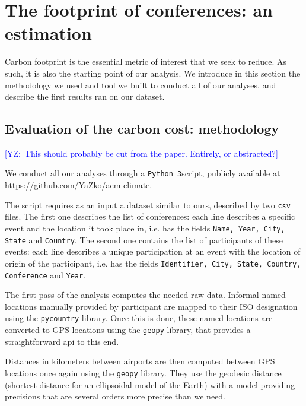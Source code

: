 \documentclass[manuscript, review, screen]{acmart}
\newcommand{\yz}[1]{\textcolor{blue}{{[YZ:~#1]}}}
\newcommand{\yz}[1]{}
\newcommand{\python}{\texttt{Python 3}}
\begin{document}

\section{The footprint of conferences: an estimation}

Carbon footprint is the essential metric of interest that we seek to reduce.
As such, it is also the starting point of our analysis.
We introduce in this section the methodology we used and tool we built to
conduct all of our analyses, and describe the first results ran on our dataset.

\subsection{Evaluation of the carbon cost: methodology}
\label{sec:methodo}

\yz{This should probably be cut from the paper. Entirely, or abstracted?}

We conduct all our analyses through a \python script, publicly available at
\url{https://github.com/YaZko/acm-climate}.

The script requires as an input a dataset similar to ours, described by two
\texttt{csv} files. The first one describes the list of conferences: each line
describes a specific event and the location it took place in, i.e. has the
fields \texttt{Name, Year, City, State} and \texttt{Country}. The second one
contains the list of participants of these events: each line describes a unique
participation at an event with the location of origin of the participant, i.e.
has the fields \texttt{Identifier, City, State, Country, Conference} and
\texttt{Year}.

The first pass of the analysis computes the needed raw data. 
Informal named locations manually provided by participant are mapped to their
ISO designation using the \texttt{pycountry} library.
Once this is done, these named locations are converted to GPS
locations using the \texttt{geopy} library, that provides a straightforward api
to this end.


Distances in kilometers between airports are then computed between GPS locations
once again using the \texttt{geopy} library. They use the geodesic distance
(shortest distance for an ellipsoidal model of the Earth) with a model providing
precisions that are several orders more precise than we need.
\end{document}
